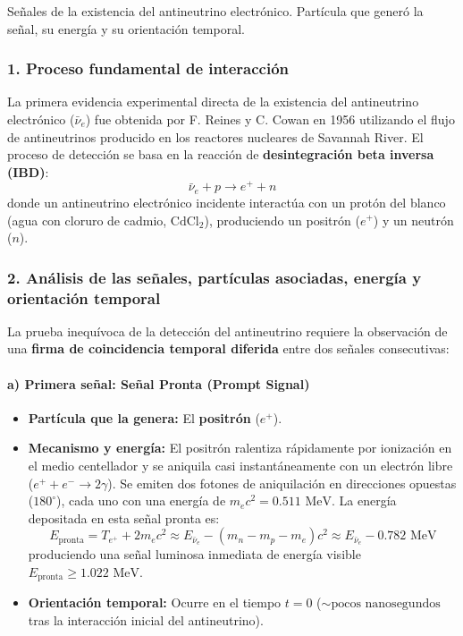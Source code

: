 \begin{problema}
Señales de la existencia del antineutrino electrónico. Partícula que generó la señal, su energía y su orientación temporal.

\tcblower

\subsubsection*{1. Proceso fundamental de interacción}

La primera evidencia experimental directa de la existencia del antineutrino electrónico ($\bar{\nu}_e$) fue obtenida por F. Reines y C. Cowan en 1956 utilizando el flujo de antineutrinos producido en los reactores nucleares de Savannah River. El proceso de detección se basa en la reacción de \textbf{desintegración beta inversa (IBD)}:
\begin{equation*}
\bar{\nu}_e + p \longrightarrow e^+ + n
\end{equation*}
donde un antineutrino electrónico incidente interactúa con un protón del blanco (agua con cloruro de cadmio, $\text{CdCl}_2$), produciendo un positrón ($e^+$) y un neutrón ($n$).

\subsubsection*{2. Análisis de las señales, partículas asociadas, energía y orientación temporal}

La prueba inequívoca de la detección del antineutrino requiere la observación de una \textbf{firma de coincidencia temporal diferida} entre dos señales consecutivas:

\paragraph{a) Primera señal: Señal Pronta (Prompt Signal)}
\begin{itemize}
    \item \textbf{Partícula que la genera:} El \textbf{positrón} ($e^+$).
    \item \textbf{Mecanismo y energía:} El positrón ralentiza rápidamente por ionización en el medio centellador y se aniquila casi instantáneamente con un electrón libre ($e^+ + e^- \to 2\gamma$). Se emiten dos fotones de aniquilación en direcciones opuestas ($180^\circ$), cada uno con una energía de $m_e c^2 = 0.511\text{ MeV}$. La energía depositada en esta señal pronta es:
    \begin{equation*}
    E_{\text{pronta}} = T_{e^+} + 2 m_e c^2 \approx E_{\bar{\nu}_e} - (m_n - m_p - m_e)c^2 \approx E_{\bar{\nu}_e} - 0.782\text{ MeV}
    \end{equation*}
    produciendo una señal luminosa inmediata de energía visible $E_{\text{pronta}} \ge 1.022\text{ MeV}$.
    \item \textbf{Orientación temporal:} Ocurre en el tiempo \textbf{$t = 0$} ($\sim \text{pocos nanosegundos}$ tras la interacción inicial del antineutrino).
\end{itemize}


\end{problema}
